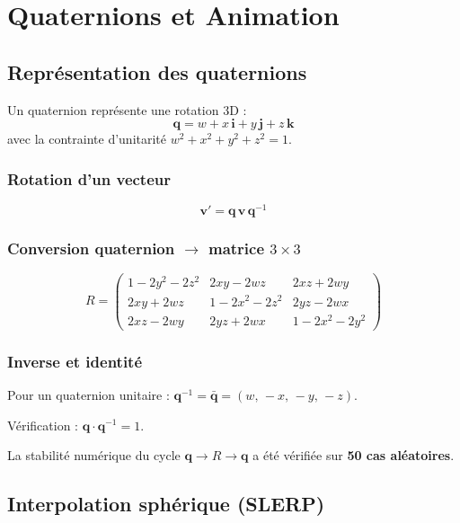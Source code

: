 \documentclass[11pt,a4paper]{article}
\begin{document}
\newpage

\section{Quaternions et Animation}

\subsection{Représentation des quaternions}

Un quaternion représente une rotation 3D :
\[
\mathbf{q} = w + x\,\mathbf{i} + y\,\mathbf{j} + z\,\mathbf{k}
\]
avec la contrainte d'unitarité $w^2 + x^2 + y^2 + z^2 = 1$.

\subsubsection{Rotation d'un vecteur}
\[
\mathbf{v}' = \mathbf{q}\,\mathbf{v}\,\mathbf{q}^{-1}
\]

\subsubsection{Conversion quaternion $\to$ matrice $3\times3$}

\[
R = \begin{pmatrix}
1-2y^2-2z^2 & 2xy-2wz     & 2xz+2wy \\
2xy+2wz     & 1-2x^2-2z^2 & 2yz-2wx \\
2xz-2wy     & 2yz+2wx     & 1-2x^2-2y^2
\end{pmatrix}
\]

\subsubsection{Inverse et identité}

Pour un quaternion unitaire : $\mathbf{q}^{-1} = \bar{\mathbf{q}} = (w,\,-x,\,-y,\,-z)$.

Vérification : $\mathbf{q} \cdot \mathbf{q}^{-1} = 1$.

La stabilité numérique du cycle $\mathbf{q} \to R \to \mathbf{q}$ a été vérifiée sur \textbf{50 cas aléatoires}.

\subsection{Interpolation sphérique (SLERP)}
\end{document}
